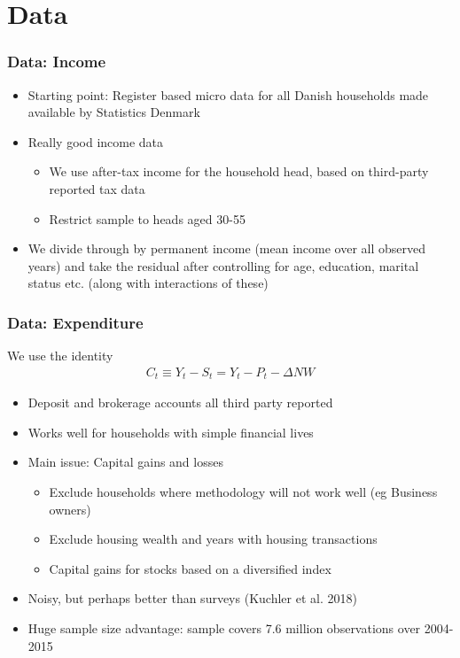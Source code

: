 \documentclass{beamer}
\begin{document}
\section{Data}
\frame
{
	\frametitle{Data: Income}
	\begin{itemize}
		\item Starting point: Register based micro data for all Danish households made available by Statistics Denmark
		\item Really good income data
		\begin{itemize}
			\item We use after-tax income for the household head, based on third-party reported tax data
			\item Restrict sample to heads aged 30-55
		\end{itemize}
		\item We divide through by permanent income (mean income over all observed years) and take the residual after controlling for age, education, marital status etc. (along with interactions of these)
	\end{itemize}
}
\frame
{
	\frametitle{Data: Expenditure}
	We use the identity
		\begin{align*}
			C_t \equiv Y_t - S_t = Y_t - P_t - \Delta NW
		\end{align*}
	\begin{itemize}
		\item Deposit and brokerage accounts all third party reported
		\item Works well for households with simple financial lives
		\item Main issue: Capital gains and losses
		\begin{itemize}
			\item Exclude households where methodology will not work well (eg Business owners)
			\item Exclude housing wealth and years with housing transactions
			\item Capital gains for stocks based on a diversified index
		\end{itemize}
		\item Noisy, but perhaps better than surveys (Kuchler et al. 2018)
		\item Huge sample size advantage: sample covers 7.6 million observations over 2004-2015
	\end{itemize}
}
\end{document}
